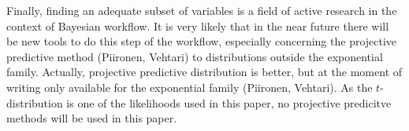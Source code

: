 Finally, finding an adequate subset of variables is a field of active research in the context of Bayesian workflow.
It is very likely that in the near future there will be new tools to do this step of the workflow, especially concerning the projective predictive method (Piironen, Vehtari) to distributions outside the exponential family.
Actually, projective predictive distribution is better, but at the moment of writing only available for the exponential family (Piironen, Vehtari).
As the $t$-distribution is one of the likelihoods used in this paper, no projective predicitve methods will be used in this paper.

